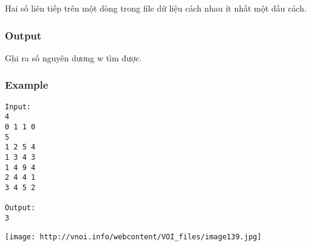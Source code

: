 Hai số liên tiếp trên một dòng trong file dữ liệu cách nhau ít nhất một dấu cách.

\subsubsection{Output}

Ghi ra số nguyên dương w tìm được.

\subsubsection{Example}
\begin{verbatim}
Input:
4
0 1 1 0
5
1 2 5 4
1 3 4 3
1 4 9 4
2 4 4 1
3 4 5 2

Output:
3

\end{verbatim}


\texttt{[image: http://vnoi.info/webcontent/VOI\_files/image139.jpg]}